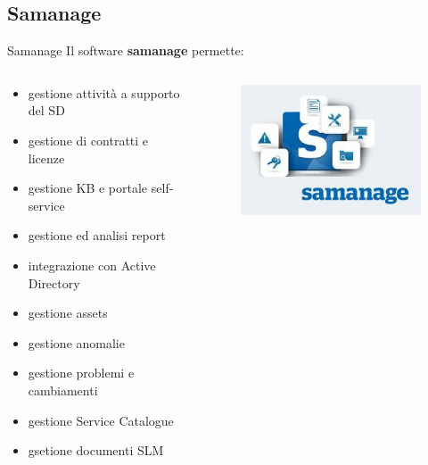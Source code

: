 \subsection{Samanage}
\begin{frame}{Samanage}
Il software \textbf{samanage} permette:
\begin{columns}
\begin{column}{0.8\textwidth}
\begin{itemize}
\item{gestione attività a supporto del SD}
\item{gestione di contratti e licenze}
\item{gestione KB e portale self-service}
\item{gestione ed analisi report}
\item{integrazione con Active Directory}
\item{gestione assets}
\item{gestione anomalie}
\item{gestione problemi e cambiamenti}
\item{gestione Service Catalogue}
\item{gsetione documenti SLM}
\end{itemize}
\end{column}
\begin{column}{0.2\textwidth}
\begin{figure}
\hspace{-20mm}
\vspace{20mm}
\includegraphics[scale=0.4]{Images/Samanage.png}
\end{figure}
\end{column}
\end{columns}
\end{frame}











